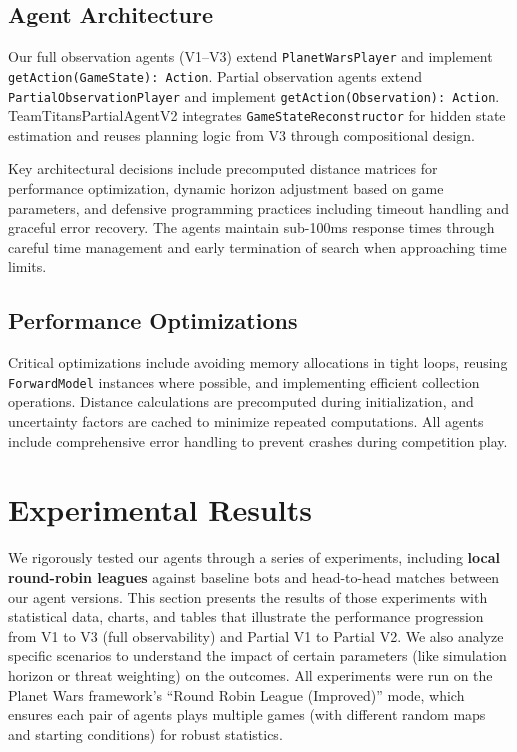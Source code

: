 \documentclass[conference]{IEEEtran}
\begin{document}
\subsection{Agent Architecture}

Our full observation agents (V1--V3) extend \texttt{PlanetWarsPlayer} and implement \texttt{getAction(GameState): Action}. Partial observation agents extend \texttt{PartialObservationPlayer} and implement \texttt{getAction(Observation): Action}. TeamTitansPartialAgentV2 integrates \texttt{GameStateReconstructor} for hidden state estimation and reuses planning logic from V3 through compositional design.

Key architectural decisions include precomputed distance matrices for performance optimization, dynamic horizon adjustment based on game parameters, and defensive programming practices including timeout handling and graceful error recovery. The agents maintain sub-100ms response times through careful time management and early termination of search when approaching time limits.

\subsection{Performance Optimizations}

Critical optimizations include avoiding memory allocations in tight loops, reusing \texttt{ForwardModel} instances where possible, and implementing efficient collection operations. Distance calculations are precomputed during initialization, and uncertainty factors are cached to minimize repeated computations. All agents include comprehensive error handling to prevent crashes during competition play.

\section{Experimental Results}

We rigorously tested our agents through a series of experiments, including \textbf{local round-robin leagues} against baseline bots and head-to-head matches between our agent versions. This section presents the results of those experiments with statistical data, charts, and tables that illustrate the performance progression from V1 to V3 (full observability) and Partial V1 to Partial V2. We also analyze specific scenarios to understand the impact of certain parameters (like simulation horizon or threat weighting) on the outcomes. All experiments were run on the Planet Wars framework's ``Round Robin League (Improved)'' mode, which ensures each pair of agents plays multiple games (with different random maps and starting conditions) for robust statistics.
\end{document}
